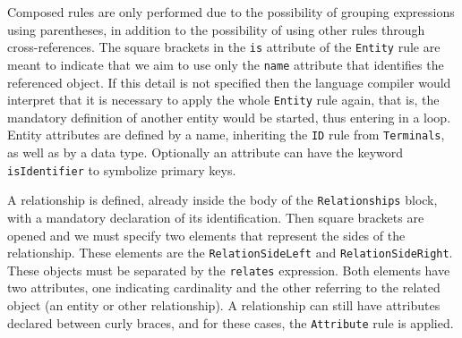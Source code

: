 Composed rules are only performed due to the possibility of grouping expressions using parentheses, in addition to the possibility of using other rules through cross-references.
The square brackets in the \texttt{is} attribute of the \texttt{Entity} rule are meant to indicate that we aim to use only the \texttt{name} attribute that identifies the referenced object.
If this detail is not specified then the language compiler would interpret that it is necessary to apply the whole \texttt{Entity} rule again, that is, the mandatory definition of another entity would be started, thus entering in a loop.
Entity attributes are defined by a name, inheriting the \texttt{ID} rule from \texttt{Terminals}, as well as by a data type. 
Optionally an attribute can have the keyword \texttt{isIdentifier} to symbolize primary keys.

A relationship is defined, already inside the body of the \texttt{Relationships} block, with a mandatory declaration of its identification.
Then square brackets are opened and we must specify two elements that represent the sides of the relationship.
These elements are the \texttt{RelationSideLeft} and \texttt{RelationSideRight}.
These objects must be separated by the \texttt{relates} expression.
Both elements have two attributes, one indicating cardinality and the other referring to the related object (an entity or other relationship).
A relationship can still have attributes declared between curly braces, and for these cases, the \texttt{Attribute} rule is applied.


